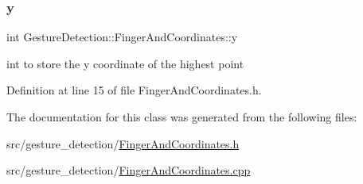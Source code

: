 \subsubsection{\texorpdfstring{y}{y}}
{\footnotesize\ttfamily int Gesture\+Detection\+::\+Finger\+And\+Coordinates\+::y}



int to store the y coordinate of the highest point 



Definition at line 15 of file Finger\+And\+Coordinates.\+h.



The documentation for this class was generated from the following files\+:\begin{DoxyCompactItemize}
\item 
src/gesture\+\_\+detection/\hyperlink{_finger_and_coordinates_8h}{Finger\+And\+Coordinates.\+h}\item 
src/gesture\+\_\+detection/\hyperlink{_finger_and_coordinates_8cpp}{Finger\+And\+Coordinates.\+cpp}\end{DoxyCompactItemize}
